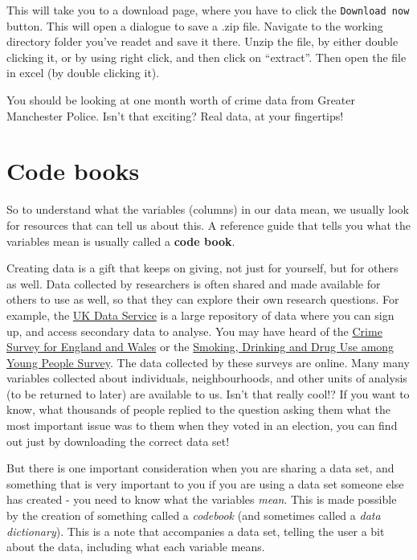 \documentclass[]{book}
\theoremstyle{definition}
\theoremstyle{definition}
\theoremstyle{definition}
\theoremstyle{remark}
\begin{document}
This will take you to a download page, where you have to click the
\texttt{Download\ now} button. This will open a dialogue to save a .zip
file. Navigate to the working directory folder you've readet and save it
there. Unzip the file, by either double clicking it, or by using right
click, and then click on ``extract''. Then open the file in excel (by
double clicking it).

You should be looking at one month worth of crime data from Greater
Manchester Police. Isn't that exciting? Real data, at your fingertips!

\hypertarget{code-books}{%
\section{Code books}\label{code-books}}

So to understand what the variables (columns) in our data mean, we
usually look for resources that can tell us about this. A reference
guide that tells you what the variables mean is usually called a
\textbf{code book}.

Creating data is a gift that keeps on giving, not just for yourself, but
for others as well. Data collected by researchers is often shared and
made available for others to use as well, so that they can explore their
own research questions. For example, the
\href{https://www.ukdataservice.ac.uk/}{UK Data Service} is a large
repository of data where you can sign up, and access secondary data to
analyse. You may have heard of the
\href{http://www.crimesurvey.co.uk/}{Crime Survey for England and Wales}
or the \href{http://content.digital.nhs.uk/catalogue/PUB17879}{Smoking,
Drinking and Drug Use among Young People Survey}. The data collected by
these surveys are online. Many many variables collected about
individuals, neighbourhoods, and other units of analysis (to be returned
to later) are available to us. Isn't that really cool!? If you want to
know, what thousands of people replied to the question asking them what
the most important issue was to them when they voted in an election, you
can find out just by downloading the correct data set!

But there is one important consideration when you are sharing a data
set, and something that is very important to you if you are using a data
set someone else has created - you need to know what the variables
\emph{mean}. This is made possible by the creation of something called a
\emph{codebook} (and sometimes called a \emph{data dictionary}). This is
a note that accompanies a data set, telling the user a bit about the
data, including what each variable means.
\end{document}
